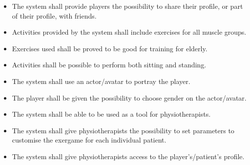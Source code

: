 \begin{itemize}
\item The system shall provide players the possibility to share their profile, or part of their profile, with friends. 
\item Activities provided by the system shall include exercises for all muscle groups.
\item Exercises used shall be proved to be good for training for elderly.  
\item Activities shall be possible to perform both sitting and standing. 
\item The system shall use an actor/avatar to portray the player.
\item The player shall be given the possibility to choose gender on the actor/avatar. 
\item The system shall be able to be used as a tool for physiotherapists.
\item The system shall give physiotherapists the possibility to set parameters to customise the exergame for each individual patient.
\item The system shall give physiotherapists access to the player's/patient's profile. 
\end{itemize}

